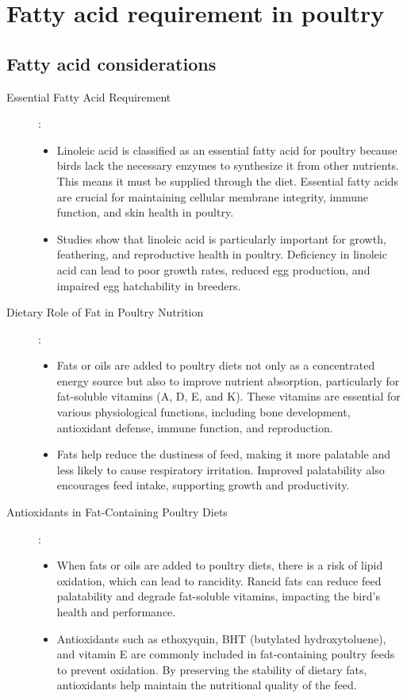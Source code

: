 \documentclass[a4paper,12pt]{article}
\begin{document}
\newpage

\section{Fatty acid requirement in poultry}
\subsection{Fatty acid considerations}

\begin{description}
	\item[Essential Fatty Acid Requirement]:
		\begin{itemize}
			\item Linoleic acid is classified as an essential fatty acid for poultry because birds lack the necessary enzymes to synthesize it from other nutrients. This means it must
be supplied through the diet. Essential fatty acids are crucial for maintaining
cellular membrane integrity, immune function, and skin health in poultry.
			\item Studies show that linoleic acid is particularly important for growth, feathering, and reproductive health in poultry. Deficiency in linoleic acid can lead to poor growth
rates, reduced egg production, and impaired egg hatchability in breeders.
		\end{itemize}
		
	\item[Dietary Role of Fat in Poultry Nutrition]:
		\begin{itemize}
			\item Fats or oils are added to poultry diets not only as a concentrated energy source but also to improve nutrient absorption, particularly for fat-soluble vitamins (A, D,
E, and K). These vitamins are essential for various physiological functions,
including bone development, antioxidant defense, immune function, and
reproduction.
			\item Fats help reduce the dustiness of feed, making it more palatable and less likely to cause respiratory irritation. Improved palatability also encourages feed intake,
supporting growth and productivity.
		\end{itemize}
		
	\item[Antioxidants in Fat-Containing Poultry Diets]:
		\begin{itemize}
			\item When fats or oils are added to poultry diets, there is a risk of lipid oxidation, which can lead to rancidity. Rancid fats can reduce feed palatability and degrade
fat-soluble vitamins, impacting the bird's health and performance.
			\item Antioxidants such as ethoxyquin, BHT (butylated hydroxytoluene), and vitamin E are commonly included in fat-containing poultry feeds to prevent oxidation. By
preserving the stability of dietary fats, antioxidants help maintain the nutritional
quality of the feed.
		\end{itemize}
\end{description}
\end{document}
